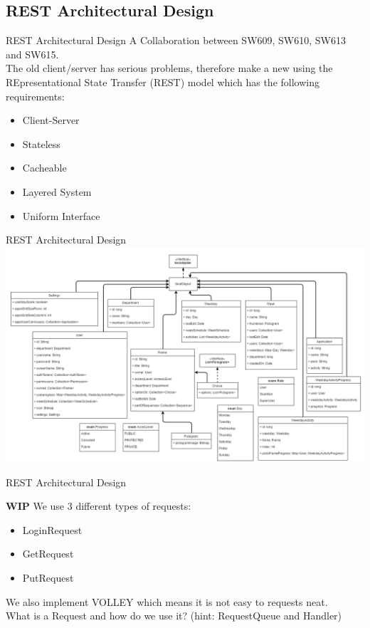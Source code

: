 \subsection{REST Architectural Design}
\begin{frame}{REST Architectural Design}
A Collaboration between SW609, SW610, SW613 and SW615.\\

The old client/server has serious problems, therefore make a new using the REpresentational State Transfer (REST) model which has the following requirements:
\begin{itemize}
\item Client-Server
\item Stateless
\item Cacheable
\item Layered System
\item Uniform Interface
\end{itemize}
\end{frame}

\begin{frame}{REST Architectural Design}
\includegraphics[scale=0.3]{figures/Giraf_RestModelV3.PNG}
\end{frame}

\begin{frame}{REST Architectural Design}

\textbf{WIP}
We use 3 different types of requests:
\begin{itemize}
\item LoginRequest
\item GetRequest
\item PutRequest
\end{itemize}

We also implement VOLLEY which means it is not easy to requests neat.\\
What is a Request and how do we use it? (hint: RequestQueue and Handler)
\end{frame}

